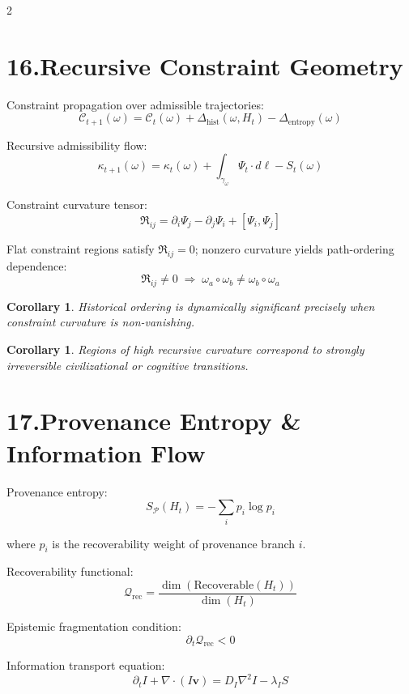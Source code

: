 \documentclass[10pt,a4paper]{article}
\theoremstyle{plain}
\newtheorem{corollary}[theorem]{Corollary}
\theoremstyle{remark}
\newcommand{\Pp}{\mathcal{P}}
\begin{document}
\begin{multicols}{2}

\section*{16.\enspace Recursive Constraint Geometry}

Constraint propagation over admissible trajectories:
\[
\mathcal{C}_{t+1}(\omega)
=
\mathcal{C}_t(\omega)
+
\Delta_{\mathrm{hist}}(\omega,H_t)
-
\Delta_{\mathrm{entropy}}(\omega)
\]

Recursive admissibility flow:
\[
\kappa_{t+1}(\omega)
=
\kappa_t(\omega)
+
\int_{\gamma_\omega}
\Psi_t \cdot d\ell
-
S_t(\omega)
\]

Constraint curvature tensor:
\[
\mathfrak{R}_{ij}
=
\partial_i\Psi_j
-
\partial_j\Psi_i
+
[\Psi_i,\Psi_j]
\]

Flat constraint regions satisfy $\mathfrak{R}_{ij}=0$;
nonzero curvature yields path-ordering dependence:
\[
\mathfrak{R}_{ij}\neq0
\;\Rightarrow\;
\omega_a\circ\omega_b
\neq
\omega_b\circ\omega_a
\]

\begin{corollary}
Historical ordering is dynamically significant precisely when
constraint curvature is non-vanishing.
\end{corollary}

\begin{corollary}
Regions of high recursive curvature correspond to strongly irreversible
civilizational or cognitive transitions.
\end{corollary}

\section*{17.\enspace Provenance Entropy \& Information Flow}

Provenance entropy:
\[
S_{\Pp}(H_t)
=
-\sum_i
p_i\log p_i
\]

where $p_i$ is the recoverability weight of provenance branch $i$.

Recoverability functional:
\[
\mathcal{Q}_{\mathrm{rec}}
=
\frac{
\dim(\mathrm{Recoverable}(H_t))
}{
\dim(H_t)
}
\]

Epistemic fragmentation condition:
\[
\partial_t\mathcal{Q}_{\mathrm{rec}} < 0
\]

Information transport equation:
\[
\partial_t I
+
\nabla\cdot(I\mathbf{v})
=
D_I\nabla^2 I
-
\lambda_I S
\]


\end{multicols}
\end{document}
